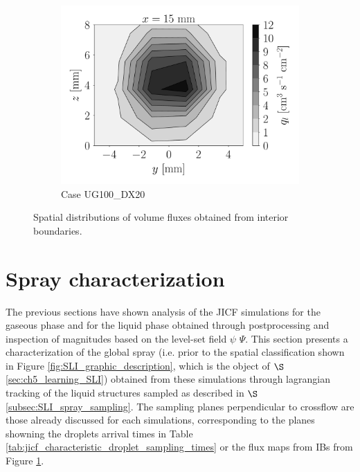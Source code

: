 \begin{figure}[ht]
\begin{subfigure}[b]{1.1\textwidth}
   \includegraphics[scale=0.225]{./part2_developments/figures_ch5_resolved_JICF/flow_rates_ibs/spatial_maps/UG100_DX20_x15mm_volume_flux}
   \vspace*{-0.1in}
	\caption{Case UG100\_DX20}
\end{subfigure}


   \caption{Spatial distributions of volume fluxes obtained from interior boundaries.}
\label{fig:ibs_spatial_distributions}
\end{figure}


\clearpage

\section{Spray characterization}
\label{sec:ch5_sec_spray_characterization}


The previous sections have shown analysis of the JICF simulations for the gaseous phase and for the liquid phase obtained through postprocessing and inspection of magnitudes based on the level-set field $\psi$ $\Psi$. This section presents a characterization of the global spray (i.e. prior to the spatial classification shown in Figure \ref{fig:SLI_graphic_description}, which is the object of $\S$\ref{sec:ch5_learning_SLI}) obtained from these simulations through lagrangian tracking of the liquid structures sampled as described in $\S$\ref{subsec:SLI_spray_sampling}. The sampling planes perpendicular to crossflow are those already discussed for each simulations, corresponding to the planes showning the droplets arrival times in Table \ref{tab:jicf_characteristic_droplet_sampling_times} or the flux maps from IBs from Figure \ref{fig:ibs_spatial_distributions}.

